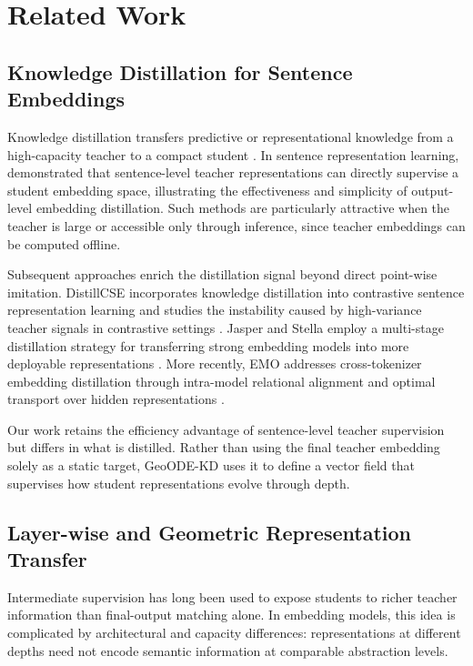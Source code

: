 \documentclass[11pt]{article}
\begin{document}

\section{Related Work}\label{sec:related}

\subsection{Knowledge Distillation for Sentence Embeddings}

Knowledge distillation transfers predictive or representational knowledge
from a high-capacity teacher to a compact student
\citep{hinton2015distilling}. In sentence representation learning,
\citet{reimers2020multilingual} demonstrated that sentence-level teacher
representations can directly supervise a student embedding space,
illustrating the effectiveness and simplicity of output-level embedding
distillation. Such methods are particularly attractive when the teacher is
large or accessible only through inference, since teacher embeddings can be
computed offline.

Subsequent approaches enrich the distillation signal beyond direct
point-wise imitation. DistillCSE incorporates knowledge distillation into
contrastive sentence representation learning and studies the instability
caused by high-variance teacher signals in contrastive settings
\citep{xu2023distillcse}. Jasper and Stella employ a multi-stage
distillation strategy for transferring strong embedding models into more
deployable representations \citep{zhang2024jasper}. More recently, EMO
addresses cross-tokenizer embedding distillation through intra-model
relational alignment and optimal transport over hidden representations
\citep{truong2025emo}.

Our work retains the efficiency advantage of sentence-level teacher
supervision but differs in what is distilled. Rather than using the final
teacher embedding solely as a static target, GeoODE-KD uses it to define a
vector field that supervises how student representations evolve through
depth.

\subsection{Layer-wise and Geometric Representation Transfer}

Intermediate supervision has long been used to expose students to richer
teacher information than final-output matching alone. In embedding models,
this idea is complicated by architectural and capacity differences:
representations at different depths need not encode semantic information at
comparable abstraction levels.
\end{document}
